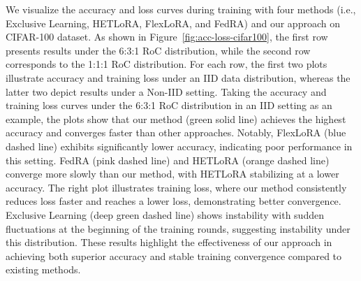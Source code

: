 \documentclass[lettersize,journal]{IEEEtran}
\begin{document}
{
We visualize the accuracy and loss curves during training with four methods (i.e., Exclusive Learning, HETLoRA, FlexLoRA, and FedRA) and our approach on CIFAR-100 dataset. As shown in Figure~\ref{fig:acc-loss-cifar100}, the first row presents results under the 6:3:1 RoC distribution, while the second row corresponds to the 1:1:1 RoC distribution. For each row, the first two plots illustrate accuracy and training loss under an IID data distribution, whereas the latter two depict results under a Non-IID setting.
Taking the accuracy and training loss curves under the 6:3:1 RoC distribution in an IID setting as an example, the plots show that our method (green solid line) achieves the highest accuracy and converges faster than other approaches. Notably, FlexLoRA (blue dashed line) exhibits significantly lower accuracy, indicating poor performance in this setting. FedRA (pink dashed line) and HETLoRA (orange dashed line) converge more slowly than our method, with HETLoRA stabilizing at a lower accuracy. The right plot illustrates training loss, where our method consistently reduces loss faster and reaches a lower loss, demonstrating better convergence. Exclusive Learning (deep green dashed line) shows instability with sudden fluctuations at the beginning of the training rounds, suggesting instability under this distribution. These results highlight the effectiveness of our approach in achieving both superior accuracy and stable training convergence compared to existing methods.
}
\end{document}
